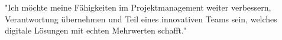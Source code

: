 \documentclass{resume}
\begin{document}
\begin{center}
\small "Ich möchte meine Fähigkeiten im Projektmanagement weiter verbessern, Verantwortung übernehmen und Teil eines innovativen Teams sein, welches digitale Lösungen mit echten Mehrwerten schafft."



\end{center}
\end{document}
